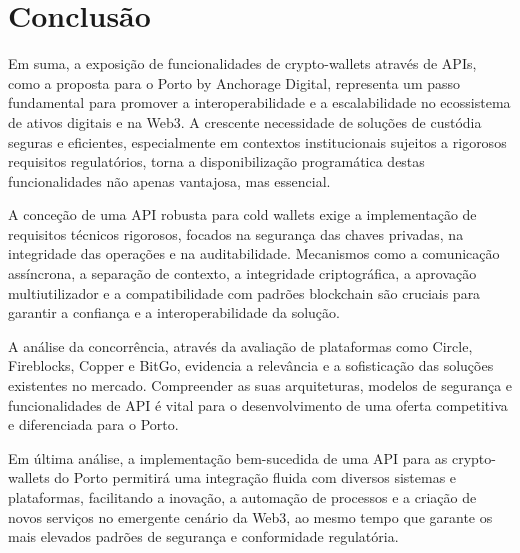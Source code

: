 \newpage
\thispagestyle{otherpages}
\section{Conclusão}
Em suma, a exposição de funcionalidades de crypto-wallets através de APIs, como a proposta para o Porto by Anchorage Digital, representa um passo fundamental para promover a interoperabilidade e a escalabilidade no ecossistema de ativos digitais e na Web3. A crescente necessidade de soluções de custódia seguras e eficientes, especialmente em contextos institucionais sujeitos a rigorosos requisitos regulatórios, torna a disponibilização programática destas funcionalidades não apenas vantajosa, mas essencial.

A conceção de uma API robusta para cold wallets exige a implementação de requisitos técnicos rigorosos, focados na segurança das chaves privadas, na integridade das operações e na auditabilidade. Mecanismos como a comunicação assíncrona, a separação de contexto, a integridade criptográfica, a aprovação multiutilizador e a compatibilidade com padrões blockchain são cruciais para garantir a confiança e a interoperabilidade da solução.

A análise da concorrência, através da avaliação de plataformas como Circle, Fireblocks, Copper e BitGo, evidencia a relevância e a sofisticação das soluções existentes no mercado. Compreender as suas arquiteturas, modelos de segurança e funcionalidades de API é vital para o desenvolvimento de uma oferta competitiva e diferenciada para o Porto.

Em última análise, a implementação bem-sucedida de uma API para as crypto-wallets do Porto permitirá uma integração fluida com diversos sistemas e plataformas, facilitando a inovação, a automação de processos e a criação de novos serviços no emergente cenário da Web3, ao mesmo tempo que garante os mais elevados padrões de segurança e conformidade regulatória.